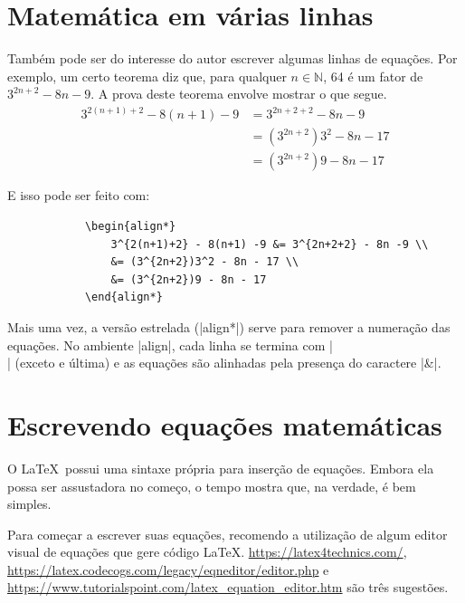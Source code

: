 \documentclass[12pt,oneside,a4paper,english,brazil]{abntex2}
\begin{document}
    \section{Matemática em várias linhas}
        
        Também pode ser do interesse do autor escrever algumas linhas de equações. Por exemplo, um certo teorema diz que, para qualquer $ n \in \mathbb{N} $, 64 é um fator de $ 3^{2n+2} - 8n - 9 $. A prova deste teorema envolve mostrar o que segue.
        \begin{align*}
            3^{2(n + 1) + 2} - 8(n + 1) - 9 &= 3^{2n + 2 + 2} - 8n - 9 \\
            &= (3^{2n+2})3^2 - 8n - 17 \\
            &= (3^{2n+2})9 - 8n - 17
        \end{align*}
        
        E isso pode ser feito com:
        
        \begin{verbatim}
            \begin{align*}
                3^{2(n+1)+2} - 8(n+1) -9 &= 3^{2n+2+2} - 8n -9 \\
                &= (3^{2n+2})3^2 - 8n - 17 \\
                &= (3^{2n+2})9 - 8n - 17
            \end{align*}
        \end{verbatim}
        
        Mais uma vez, a versão estrelada (\ltx|align*|) serve para remover a numeração das equações. No ambiente \ltx|align|, cada linha se termina com \ltx|\\| (exceto e última) e as equações são alinhadas pela presença do caractere \ltx|&|.
    
    \section{Escrevendo equações matemáticas}
    
        O \LaTeX\ possui uma sintaxe própria para inserção de equações. Embora ela possa ser assustadora no começo, o tempo mostra que, na verdade, é bem simples.
        
        Para começar a escrever suas equações, recomendo a utilização de algum editor visual de equações que gere código \LaTeX. \url{https://latex4technics.com/}, \url{https://latex.codecogs.com/legacy/eqneditor/editor.php} e \url{https://www.tutorialspoint.com/latex_equation_editor.htm} são três sugestões.
        
\end{document}
